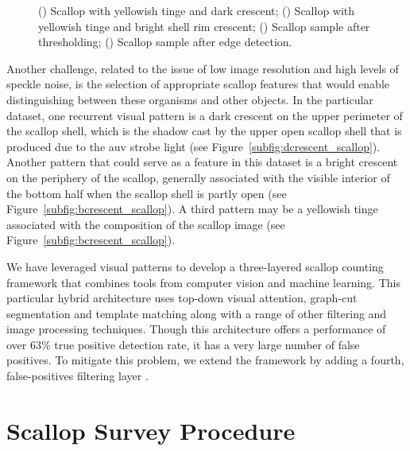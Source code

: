 \documentclass {udthesis}
\begin{document}
\begin{figure}
\begin{subfigure}[]{0.17\textwidth}
      \caption{}
      \label{subfig:edge_scallop}
  \end{subfigure}
\caption[Scallop features]{() Scallop with yellowish tinge and dark crescent; () Scallop with yellowish tinge and bright shell rim crescent; () Scallop sample after thresholding; () Scallop sample after edge detection.
}
\end{figure}

Another challenge, related to the issue of low image resolution and high levels of speckle noise, is the selection of appropriate scallop features that would enable distinguishing between these organisms and other objects. 
In the particular dataset, one recurrent visual pattern is a dark crescent on the upper perimeter of the scallop shell, which is the shadow cast by the upper open scallop shell that is produced due to the \gls{auv} strobe light (see Figure~\ref{subfig:dcrescent_scallop}). 
Another pattern that could serve as a feature in this dataset is a bright crescent on the periphery of the scallop, generally associated with the visible interior of the bottom half when the scallop shell is partly open (see Figure~\ref{subfig:bcrescent_scallop}).
A third pattern may be a yellowish tinge associated with the composition of the scallop image (see Figure~\ref{subfig:bcrescent_scallop}).

We have leveraged visual patterns \cite{prasanna_aslo} to develop a three-layered scallop counting framework  that combines tools from computer vision and machine learning. 
This particular hybrid architecture uses top-down visual attention, graph-cut segmentation and template matching along with a range of other filtering and image processing techniques. 
Though this architecture offers a performance of over 63\% true positive detection rate, it has a very large number of false positives. 
To mitigate this problem, we extend the framework \cite{prasanna_aslo} by adding a fourth, false-positives filtering layer \cite{prasanna_igi}.

\section{Scallop Survey Procedure}
\end{document}
